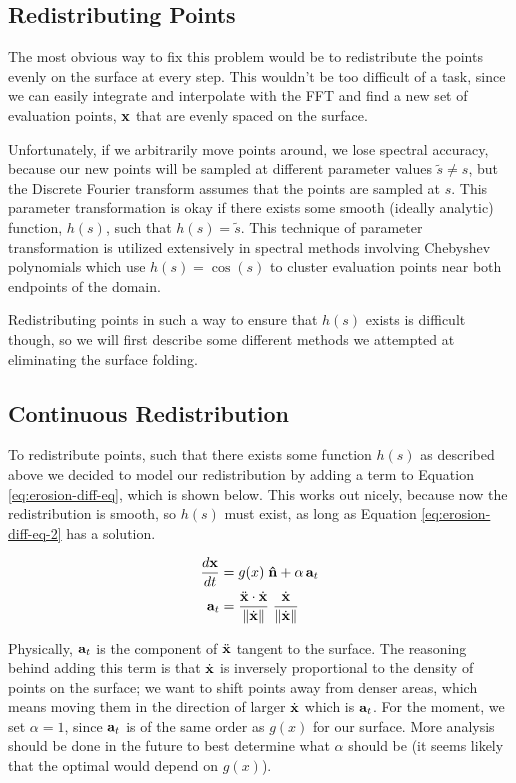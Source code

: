 \subsection*{Redistributing Points}

The most obvious way to fix this problem would be to redistribute the points evenly on the surface at every step. This wouldn't be too difficult of a task, since we can easily integrate and interpolate with the FFT and find a new set of evaluation points, $\mathbf{x}$ that are evenly spaced on the surface. 

Unfortunately, if we arbitrarily move points around, we lose spectral accuracy, because our new points will be sampled at different parameter values $\tilde{s} \ne s$, but the Discrete Fourier transform assumes that the points are sampled at $s$. This parameter transformation is okay if there exists some smooth (ideally analytic) function, $h(s)$, such that $h(s) = \tilde{s}$. This technique of parameter transformation is utilized extensively in spectral methods involving Chebyshev polynomials which use $h(s) = \cos(s)$ to cluster evaluation points near both endpoints of the domain.

Redistributing points in such a way to ensure that $h(s)$ exists is difficult though, so we will first describe some different methods we attempted at eliminating the surface folding.

\subsection*{Continuous Redistribution}

To redistribute points, such that there exists some function $h(s)$ as described above we decided to model our redistribution by adding a term to Equation \ref{eq:erosion-diff-eq}, which is shown below. This works out nicely, because now the redistribution is smooth, so $h(s)$ must exist, as long as Equation \ref{eq:erosion-diff-eq-2} has a solution.

\begin{align}
  \label{eq:erosion-diff-eq-2}
  \frac{d\bvec{x}}{dt}& = g(x) \; \bhat{n} + \alpha \, \bvec{a}_t\\
  \bvec{a}_t& = \frac{\ddot{\bvec{x}} \cdot \dot{\bvec{x}}}{\norm{\dot{\bvec{x}}}} \; \frac{\dot{\bvec{x}}}{\norm{\dot{\bvec{x}}}}
\end{align}

Physically, $\mathbf{a}_t$ is the component of $\ddot{\mathbf{x}}$ tangent to the surface. The reasoning behind adding this term is that $\dot{\mathbf{x}}$ is inversely proportional to the density of points on the surface; we want to shift points away from denser areas, which means moving them in the direction of larger $\dot{\mathbf{x}}$ which is $\mathbf{a}_t$. For the moment, we set $\alpha = 1$, since $\mathbf{a}_t$ is of the same order as $g(x)$ for our surface. More analysis should be done in the future to best determine what $\alpha$ should be (it seems likely that the optimal would depend on $g(x)$). 

